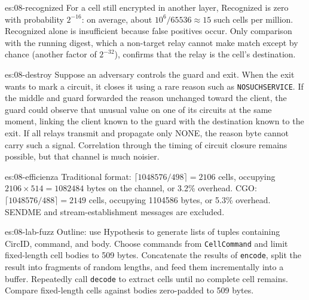 \begin{soluzione}{es:08-recognized}
For a cell still encrypted in another layer, Recognized is zero with probability $2^{-16}$: on average, about $10^6 / 65536 \approx 15$ such cells per million. Recognized alone is insufficient because false positives occur. Only comparison with the running digest, which a non-target relay cannot make match except by chance (another factor of $2^{-32}$), confirms that the relay is the cell's destination.
\end{soluzione}

\begin{soluzione}{es:08-destroy}
Suppose an adversary controls the guard and exit. When the exit wants to mark a circuit, it closes it using a rare reason such as \texttt{NOSUCHSERVICE}. If the middle and guard forwarded the reason unchanged toward the client, the guard could observe that unusual value on one of its circuits at the same moment, linking the client known to the guard with the destination known to the exit. If all relays transmit and propagate only NONE, the reason byte cannot carry such a signal. Correlation through the timing of circuit closure remains possible, but that channel is much noisier.
\end{soluzione}

\begin{soluzione}{es:08-efficienza}
Traditional format: $\lceil 1048576/498 \rceil = 2106$ cells, occupying $2106 \times 514 = \num{1082484}$ bytes on the channel, or 3.2\% overhead. CGO: $\lceil 1048576/488 \rceil = 2149$ cells, occupying \num{1104586} bytes, or 5.3\% overhead. SENDME and stream-establishment messages are excluded.
\end{soluzione}

\begin{soluzione}{es:08-lab-fuzz}
Outline: use Hypothesis to generate lists of tuples containing CircID, command, and body. Choose commands from \texttt{CellCommand} and limit fixed-length cell bodies to 509 bytes. Concatenate the results of \texttt{encode}, split the result into fragments of random lengths, and feed them incrementally into a buffer. Repeatedly call \texttt{decode} to extract cells until no complete cell remains. Compare fixed-length cells against bodies zero-padded to 509 bytes.
\end{soluzione}

